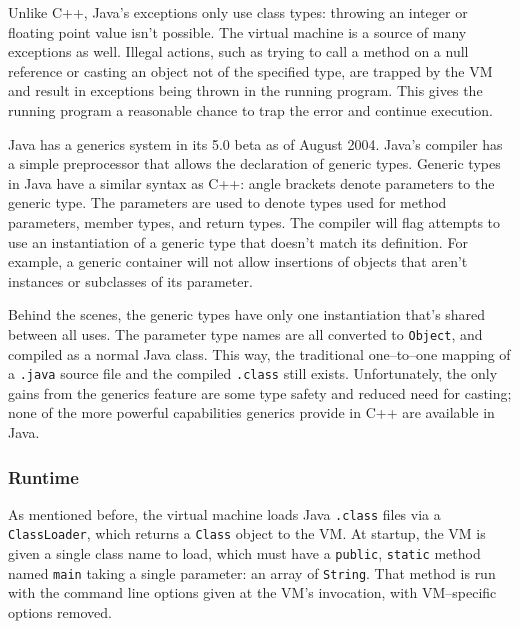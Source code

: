 Unlike C++, Java's exceptions only use class types: throwing an integer or
floating point value isn't possible. The virtual machine is a source of many
exceptions as well. Illegal actions, such as trying to call a method on a null
reference or casting an object not of the specified type, are trapped by the
VM and result in exceptions being thrown in the running program. This gives
the running program a reasonable chance to trap the error and continue
execution.

Java has a generics system in its 5.0 beta as of August
2004\cite{java-generics}. Java's compiler has a simple preprocessor that
allows the declaration of generic types. Generic types in Java have a similar
syntax as C++: angle brackets denote parameters to the generic type. The
parameters are used to denote types used for method parameters, member types,
and return types. The compiler will flag attempts to use an instantiation of a
generic type that doesn't match its definition. For example, a generic
container will not allow insertions of objects that aren't instances or
subclasses of its parameter.

Behind the scenes, the generic types have only one instantiation that's shared
between all uses. The parameter type names are all converted to
\texttt{Object}, and compiled as a normal Java class. This way, the
traditional one--to--one mapping of a \texttt{.java} source file and the
compiled \texttt{.class} still exists. Unfortunately, the only gains from the
generics feature are some type safety and reduced need for casting; none of
the more powerful capabilities generics provide in C++ are available in Java.


\subsubsection{Runtime}

As mentioned before, the virtual machine loads Java \texttt{.class} files via
a \texttt{ClassLoader}, which returns a \texttt{Class} object to the VM. At
startup, the VM is given a single class name to load, which must have a
\texttt{public}, \texttt{static} method named \texttt{main} taking a single
parameter: an array of \texttt{String}. That method is run with the command
line options given at the VM's invocation, with VM--specific options removed.

